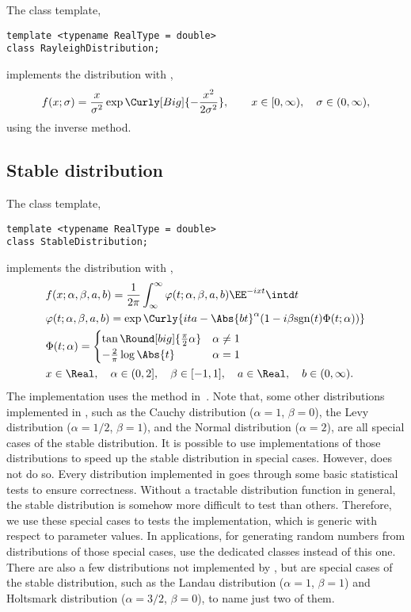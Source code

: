 The class template,
\begin{verbatim}
template <typename RealType = double>
class RayleighDistribution;
\end{verbatim}
implements the distribution with \pdf,
\begin{equation*}
  f(x;\sigma) =
  \frac{x}{\sigma^2}\exp\Curly[Big]{-\frac{x^2}{2\sigma^2}},\qquad
  x \in [0, \infty),\quad \sigma \in (0, \infty),
\end{equation*}
using the inverse method.

\subsection{Stable distribution}
\label{sub:Stable distribution}

The class template,
\begin{verbatim}
template <typename RealType = double>
class StableDistribution;
\end{verbatim}
implements the distribution with \pdf,
\begin{align*}
  &f(x;\alpha,\beta,a,b) =
  \frac{1}{2\pi}\int_{\infty}^{\infty}
  \varphi(t;\alpha,\beta,a,b)\EE^{-ixt}\intd t\\
  &\varphi(t;\alpha,\beta,a,b) =
  \exp\Curly{
    ita - \Abs{bt}^{\alpha}(1 - i\beta\mathrm{sgn}(t)\Phi(t;\alpha))} \\
  &\Phi(t;\alpha) = \begin{cases}
    \tan\Round[big]{\frac{\pi}{2}\alpha} & \alpha \ne 1 \\
    -\frac{2}{\pi}\log\Abs{t}            & \alpha = 1
  \end{cases} \\
  & x \in \Real,\quad
  \alpha \in (0, 2],\quad \beta \in [-1, 1],\quad
  a \in \Real,\quad b \in (0, \infty).
\end{align*}
The implementation uses the method in~\cite{Chambers:1976dv}. Note that, some
other distributions implemented in \mckl, such as the Cauchy distribution
($\alpha = 1$, $\beta = 0$), the Levy distribution ($\alpha = 1/2$, $\beta =
1$), and the Normal distribution ($\alpha = 2$), are all special cases of the
stable distribution. It is possible to use implementations of those
distributions to speed up the stable distribution in special cases. However,
\mckl does not do so. Every distribution implemented in \mckl goes through some
basic statistical tests to ensure correctness. Without a tractable distribution
function in general, the stable distribution is somehow more difficult to test
than others. Therefore, we use these special cases to tests the implementation,
which is generic with respect to parameter values. In applications, for
generating random numbers from distributions of those special cases, use the
dedicated classes instead of this one. There are also a few distributions not
implemented by \mckl, but are special cases of the stable distribution, such as
the Landau distribution ($\alpha = 1$, $\beta = 1$) and Holtsmark distribution
($\alpha = 3/2$, $\beta = 0$), to name just two of them.

